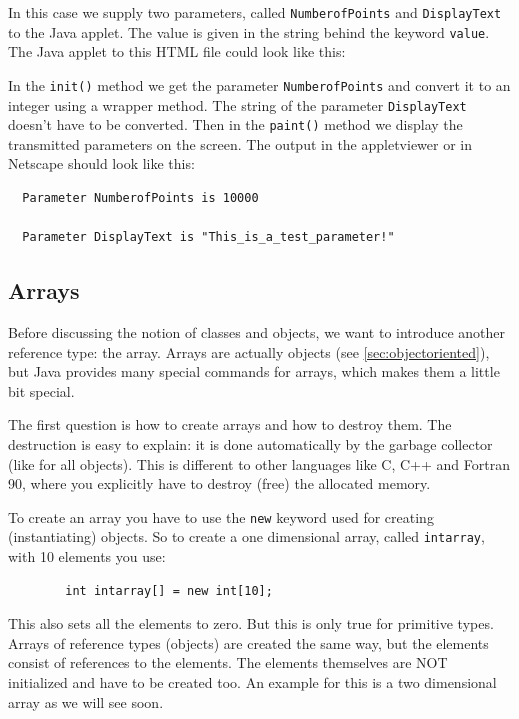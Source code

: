 In this case we supply two parameters, called \verb|NumberofPoints| and
\verb|DisplayText| to the Java applet. The value is given in the string
behind the keyword \verb|value|. The Java applet to this HTML file
could look like this:

In the \verb|init()| method we get the parameter \verb|NumberofPoints|
and convert it to an integer using a wrapper method. The string 
of the parameter \verb|DisplayText| doesn't have
to be converted. Then in the \verb|paint()| method we display
the transmitted parameters on the screen. The output in the 
appletviewer or in Netscape should look like this:
\begin{verbatim}
  Parameter NumberofPoints is 10000

  Parameter DisplayText is "This_is_a_test_parameter!"
\end{verbatim}


\subsection{Arrays}
\label{sec:Arrays}

Before discussing the notion of classes and objects, we want to introduce
another reference type: the array. Arrays are actually objects
(see \ref{sec:objectoriented}), but
Java provides many special commands for arrays, which makes them a 
little bit special.

The first question is how to create arrays and how to destroy them.
The destruction is easy to explain: it is done automatically
by the garbage collector (like for all objects). This is different to
other languages like C, C++ and Fortran 90, where you explicitly
have to destroy (free) the allocated memory. 

To create an array you have to use the \verb|new| keyword used for
creating (instantiating) objects. So to create a one dimensional
array, called \verb|intarray|, with 10 elements you use:
\begin{verbatim}
        int intarray[] = new int[10];
\end{verbatim}
This also sets all the elements to zero. But this is only true for 
primitive types. Arrays of reference types (objects) are created the
same way, but the elements consist of references to the elements. The
elements themselves are NOT initialized and have to be created too.
An example for this is a two dimensional array as we will see soon.

